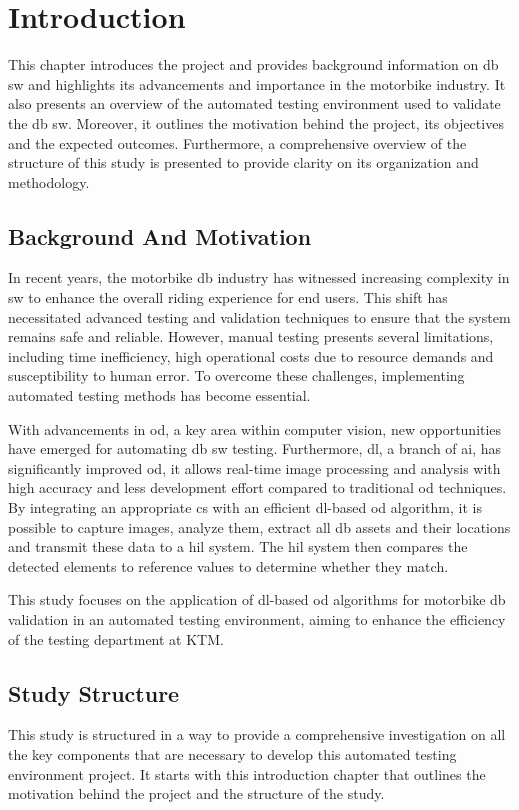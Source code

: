 \chapter{Introduction}

This chapter introduces the project and provides background information on \gls{db} \gls{sw} and highlights its advancements and importance in the motorbike industry. It also presents an overview of the automated testing environment used to validate the \gls{db} \gls{sw}. Moreover, it outlines the motivation behind the project,  its objectives and the expected outcomes. Furthermore, a comprehensive overview of the structure of this study is presented to provide clarity on its organization and methodology.

\section{Background And Motivation}
In recent years, the motorbike \gls{db} industry has witnessed increasing complexity in \gls{sw} to enhance the overall riding experience for end users. This shift has necessitated advanced testing and validation techniques to ensure that the system remains safe and reliable. However, manual testing presents several limitations, including time inefficiency, high operational costs due to resource demands and susceptibility to human error. To overcome these challenges, implementing automated testing methods has become essential.

With advancements in \gls{od}, a key area within computer vision, new opportunities have emerged for automating \gls{db} \gls{sw} testing. Furthermore, \gls{dl}, a branch of \gls{ai}, has significantly improved \gls{od}, it allows real-time image processing and analysis with high accuracy and less development effort compared to traditional \gls{od} techniques. By integrating an appropriate \gls{cs} with an efficient \gls{dl}-based \gls{od} algorithm, it is possible to capture images, analyze them, extract all \gls{db} assets and their locations and transmit these data to a \gls{hil} system. The \gls{hil} system then compares the detected elements to reference values to determine whether they match.

This study focuses on the application of \gls{dl}-based \gls{od} algorithms for motorbike \gls{db} validation in an automated testing environment, aiming to enhance the efficiency of the testing department at KTM.

\section{Study Structure}
This study is structured in a way to provide a comprehensive investigation on all the key components that are necessary to develop this automated testing environment project. It starts with this introduction chapter that outlines the motivation behind the project and the structure of the study.

